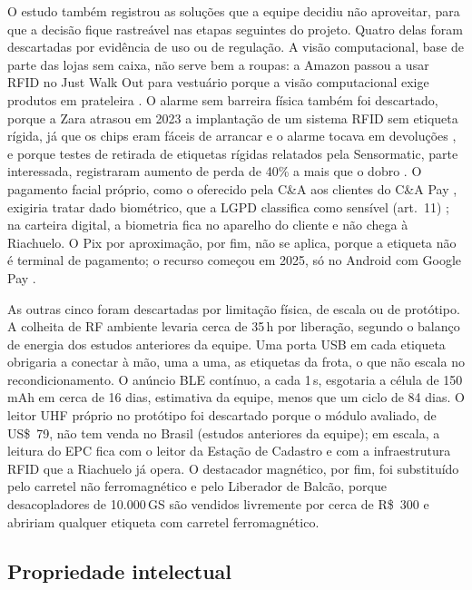 O estudo também registrou as soluções que a equipe decidiu não aproveitar, para que a decisão fique rastreável nas etapas seguintes do projeto. Quatro delas foram descartadas por evidência de uso ou de regulação. A visão computacional, base de parte das lojas sem caixa, não serve bem a roupas: a Amazon passou a usar RFID no Just Walk Out para vestuário porque a visão computacional exige produtos em prateleira \cite{amazon2024jwo}. O alarme sem barreira física também foi descartado, porque a Zara atrasou em 2023 a implantação de um sistema RFID sem etiqueta rígida, já que os chips eram fáceis de arrancar e o alarme tocava em devoluções \cite{pymnts2023zara}, e porque testes de retirada de etiquetas rígidas relatados pela Sensormatic, parte interessada, registraram aumento de perda de 40\% a mais que o dobro \cite{sensormatic2024hardtag}. O pagamento facial próprio, como o oferecido pela C\&A aos clientes do C\&A Pay \cite{mobiletime2023cea}, exigiria tratar dado biométrico, que a LGPD classifica como sensível (art.~11) \cite{brasil2018lgpd}; na carteira digital, a biometria fica no aparelho do cliente e não chega à Riachuelo. O Pix por aproximação, por fim, não se aplica, porque a etiqueta não é terminal de pagamento; o recurso começou em 2025, só no Android com Google Pay \cite{agenciabrasil2025pix}.

As outras cinco foram descartadas por limitação física, de escala ou de protótipo. A colheita de RF ambiente levaria cerca de 35\,h por liberação, segundo o balanço de energia dos estudos anteriores da equipe. Uma porta USB em cada etiqueta obrigaria a conectar à mão, uma a uma, as etiquetas da frota, o que não escala no recondicionamento. O anúncio BLE contínuo, a cada 1\,s, esgotaria a célula de 150\,mAh em cerca de 16 dias, estimativa da equipe, menos que um ciclo de 84 dias. O leitor UHF próprio no protótipo foi descartado porque o módulo avaliado, de US\$~79, não tem venda no Brasil (estudos anteriores da equipe); em escala, a leitura do EPC fica com o leitor da Estação de Cadastro e com a infraestrutura RFID que a Riachuelo já opera. O destacador magnético, por fim, foi substituído pelo carretel não ferromagnético e pelo Liberador de Balcão, porque desacopladores de 10.000\,GS são vendidos livremente por cerca de R\$~300 \cite{canalautomacao2026desacoplador} e abririam qualquer etiqueta com carretel ferromagnético.

\subsection{Propriedade intelectual}
\label{sub:r2-aprov-patentes}

